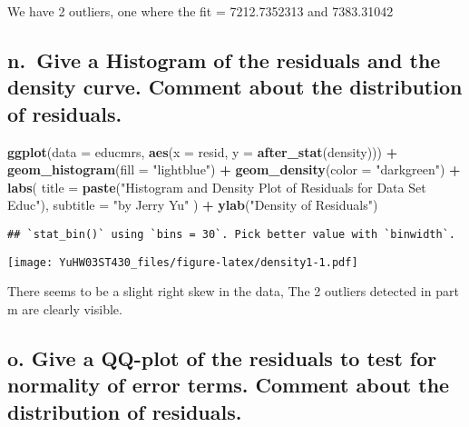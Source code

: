 \documentclass[
]{article}
\newenvironment{Shaded}{\begin{snugshade}}{\end{snugshade}}
\newcommand{\AttributeTok}[1]{\textcolor[rgb]{0.13,0.29,0.53}{#1}}
\newcommand{\FunctionTok}[1]{\textcolor[rgb]{0.13,0.29,0.53}{\textbf{#1}}}
\newcommand{\NormalTok}[1]{#1}
\newcommand{\SpecialCharTok}[1]{\textcolor[rgb]{0.81,0.36,0.00}{\textbf{#1}}}
\newcommand{\StringTok}[1]{\textcolor[rgb]{0.31,0.60,0.02}{#1}}
\begin{document}
We have 2 outliers, one where the fit = 7212.7352313 and 7383.31042

\hypertarget{n.-give-a-histogram-of-the-residuals-and-the-density-curve.-comment-about-the-distribution-of-residuals.}{%
\subsection{n.~Give a Histogram of the residuals and the density curve.
Comment about the distribution of
residuals.}\label{n.-give-a-histogram-of-the-residuals-and-the-density-curve.-comment-about-the-distribution-of-residuals.}}

\begin{Shaded}
\begin{Highlighting}[]
\FunctionTok{ggplot}\NormalTok{(}\AttributeTok{data =}\NormalTok{ educmrs, }\FunctionTok{aes}\NormalTok{(}\AttributeTok{x =}\NormalTok{ resid, }\AttributeTok{y =} \FunctionTok{after\_stat}\NormalTok{(density))) }\SpecialCharTok{+}
  \FunctionTok{geom\_histogram}\NormalTok{(}\AttributeTok{fill =} \StringTok{"lightblue"}\NormalTok{) }\SpecialCharTok{+}
  \FunctionTok{geom\_density}\NormalTok{(}\AttributeTok{color =} \StringTok{"darkgreen"}\NormalTok{) }\SpecialCharTok{+}
  \FunctionTok{labs}\NormalTok{(}
    \AttributeTok{title =} \FunctionTok{paste}\NormalTok{(}\StringTok{"Histogram and Density Plot of Residuals for Data Set Educ"}\NormalTok{),}
    \AttributeTok{subtitle =} \StringTok{"by Jerry Yu"}
\NormalTok{  ) }\SpecialCharTok{+}
  \FunctionTok{ylab}\NormalTok{(}\StringTok{"Density of Residuals"}\NormalTok{)}
\end{Highlighting}
\end{Shaded}

\begin{verbatim}
## `stat_bin()` using `bins = 30`. Pick better value with `binwidth`.
\end{verbatim}

\texttt{[image: YuHW03ST430\_files/figure-latex/density1-1.pdf]}

There seems to be a slight right skew in the data, The 2 outliers
detected in part m are clearly visible.

\hypertarget{o.-give-a-qq-plot-of-the-residuals-to-test-for-normality-of-error-terms.-comment-about-the-distribution-of-residuals.}{%
\subsection{o. Give a QQ-plot of the residuals to test for normality of
error terms. Comment about the distribution of
residuals.}\label{o.-give-a-qq-plot-of-the-residuals-to-test-for-normality-of-error-terms.-comment-about-the-distribution-of-residuals.}}
\end{document}
